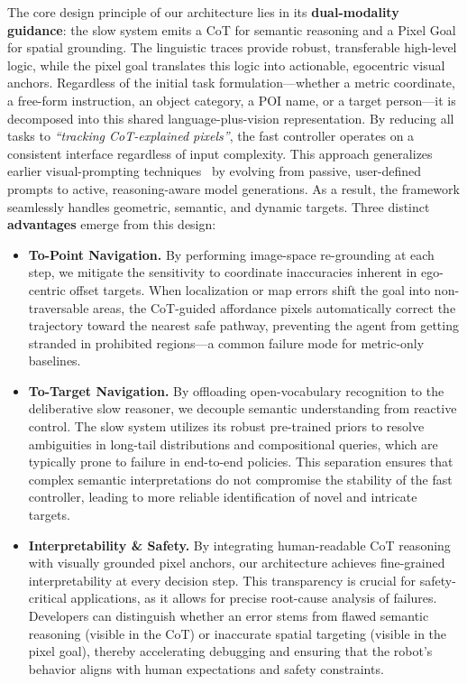 The core design principle of our architecture lies in its \textbf{dual-modality guidance}: the slow system emits a CoT for semantic reasoning and a Pixel Goal for spatial grounding. 
The linguistic traces provide robust, transferable high-level logic, while the pixel goal translates this logic into actionable, egocentric visual anchors. 
Regardless of the initial task formulation---whether a metric coordinate, a free-form instruction, an object category, a POI name, or a target person---it is decomposed into this shared language-plus-vision representation.
By reducing all tasks to \textit{``tracking CoT-explained pixels''}, the fast controller operates on a consistent interface regardless of input complexity. 
This approach generalizes earlier visual-prompting techniques~\cite{feng2026vpn,nasiriany2024pivot,sun2026openfrontier} by evolving from passive, user-defined prompts to active, reasoning-aware model generations. 
As a result, the framework seamlessly handles geometric, semantic, and dynamic targets. 
Three distinct \textbf{advantages} emerge from this design:
\begin{itemize}

\item \textbf{To-Point Navigation.} By performing image-space re-grounding at each step, we mitigate the sensitivity to coordinate inaccuracies inherent in ego-centric offset targets. When localization or map errors shift the goal into non-traversable areas, the CoT-guided affordance pixels automatically correct the trajectory toward the nearest safe pathway, preventing the agent from getting stranded in prohibited regions—a common failure mode for metric-only baselines.

\item \textbf{To-Target Navigation.} By offloading open-vocabulary recognition to the deliberative slow reasoner, we decouple semantic understanding from reactive control. The slow system utilizes its robust pre-trained priors to resolve ambiguities in long-tail distributions and compositional queries, which are typically prone to failure in end-to-end policies. This separation ensures that complex semantic interpretations do not compromise the stability of the fast controller, leading to more reliable identification of novel and intricate targets.

\item \textbf{Interpretability \& Safety.} By integrating human-readable CoT reasoning with visually grounded pixel anchors, our architecture achieves fine-grained interpretability at every decision step. This transparency is crucial for safety-critical applications, as it allows for precise root-cause analysis of failures. Developers can distinguish whether an error stems from flawed semantic reasoning (visible in the CoT) or inaccurate spatial targeting (visible in the pixel goal), thereby accelerating debugging and ensuring that the robot’s behavior aligns with human expectations and safety constraints.
\end{itemize}


